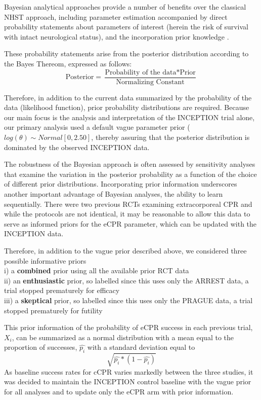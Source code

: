 \documentclass[
  super,
  preprint,
  3p]{elsarticle}
\begin{document}
Bayesian analytical approaches provide a number of benefits over the
classical NHST approach, including parameter estimation accompanied by
direct probability statements about parameters of interest (herein the
risk of survival with intact neurological status), and the incorporation
prior knowledge \citep{BrophyCardio, Zampieri}.

These probability statements arise from the posterior distribution
according to the Bayes Thereom, expressed as follows:
\[ \text{Posterior}  = \frac{\text{Probability of the data} * \text{Prior}}{\text{Normalizing Constant}} \]

Therefore, in addition to the current data summarized by the probability
of the data (likelihood function), prior probability distributions are
required. Because our main focus is the analysis and interpretation of
the INCEPTION trial alone, our primary analysis used a default vague
parameter prior (\(log(\theta) \sim Normal [0, 2.50]\), thereby assuring
that the posterior distribution is dominated by the observed INCEPTION
data.

The robustness of the Bayesian approach is often assessed by sensitivity
analyses that examine the variation in the posterior probability as a
function of the choice of different prior distributions. Incorporating
prior information underscores another important advantage of Bayesian
analyses, the ability to learn sequentially. There were two previous
RCTs examining extracorporeal CPR\citep{RN6759, RN6751} and while the
protocols are not identical, it may be reasonable to allow this data to
serve as informed priors for the eCPR parameter, which can be updated
with the INCEPTION data.

Therefore, in addition to the vague prior described above, we considered
three possible informative priors\\
i) a \textbf{combined} prior using all the available prior RCT
data\citep{RN6751, RN6759}\\
ii) an \textbf{enthusiastic} prior, so labelled since this uses only the
ARREST data, a trial stopped prematurely for efficacy\\
iii) a \textbf{skeptical} prior, so labelled since this uses only the
PRAGUE data, a trial stopped prematurely for futility

This prior information of the probability of eCPR success in each
previous trial, \(X_i\), can be summarized as a normal distribution with
a mean equal to the proportion of successes, \(\hat{p_i}\) with a
standard deviation equal to \[\sqrt{\hat{p_i}*(1-\hat{p_i})}\] As
baseline success rates for cCPR varies markedly between the three
studies, it was decided to maintain the INCEPTION control baseline with
the vague prior for all analyses and to update only the eCPR arm with
prior information.
\end{document}
